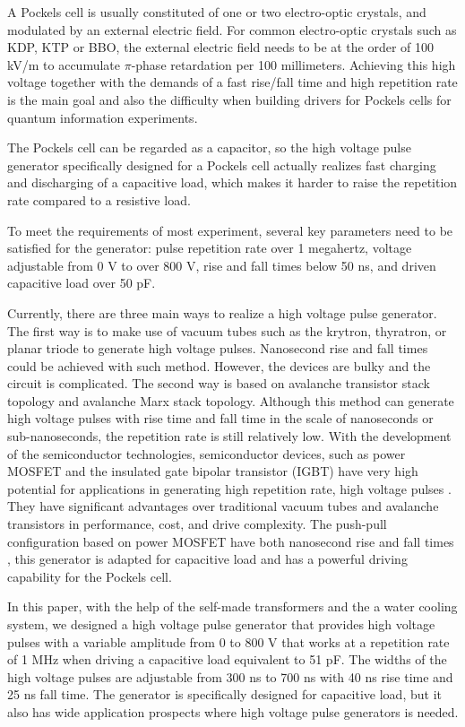 \documentclass[aip,rsi,reprint,graphicx]{revtex4-1} %
\begin{document}
A Pockels cell is usually constituted of one or two electro-optic crystals, and modulated by an external electric field. For common electro-optic crystals such as KDP, KTP or BBO, the external electric field needs to be at the order of 100 kV/m to accumulate $\pi$-phase retardation per 100 millimeters. 
Achieving this high voltage together with the demands of a fast rise/fall time and high repetition rate is the main goal and also the difficulty when building drivers for Pockels cells for quantum information experiments. 

The Pockels cell can be regarded as a capacitor, so the high voltage pulse generator specifically designed for a Pockels cell actually realizes fast charging and discharging of a capacitive load, which makes it harder to raise the repetition rate compared to a resistive load.
 
To meet the requirements of most experiment, several key parameters need to be satisfied for the generator: pulse repetition rate over 1 megahertz, voltage adjustable from 0 V to over 800 V, rise and fall times below 50 ns, and driven capacitive load over 50 pF.

Currently, there are three main ways to realize a high voltage pulse generator. 
The first way is to make use of vacuum tubes such as the krytron, thyratron, or planar triode to generate high voltage pulses\cite{Rohwein1995improved}. 
Nanosecond rise and fall times could be achieved with such method. However, the devices are bulky and the circuit is complicated. 
The second way is based on avalanche transistor stack topology and avalanche Marx stack topology\cite{Fulkerson1997,Bidin2009,bishop2006subnanosecond}. 
Although this method can generate high voltage pulses with rise time and fall time in the scale of nanoseconds or sub-nanoseconds, the repetition rate is still relatively low. 
With the development of the semiconductor technologies, semiconductor devices, such as power MOSFET and the insulated gate bipolar transistor (IGBT) have very high potential for applications in generating high repetition rate, high voltage pulses \cite{wang2013semiconductor,Feng2011}. 
They have significant advantages over traditional vacuum tubes and avalanche transistors in performance, cost, and drive complexity. 
The push-pull configuration based on power MOSFET have both nanosecond rise and fall times \cite{bernius1990improved}, this generator is adapted for capacitive load and has a powerful driving capability for the Pockels cell.\par 
In this paper, with the help of the self-made transformers and the a water cooling system, we designed a high voltage pulse generator that provides high voltage pulses with a variable amplitude from 0 to 800 V that works at a repetition rate of 1 MHz when driving a capacitive load equivalent to 51 pF.
 The widths of the high voltage pulses are adjustable from 300 ns to 700 ns with 40 ns rise time and 25 ns fall time.
 The generator is specifically designed for capacitive load, but it also has wide application prospects where high voltage pulse generators is needed.
\end{document}
